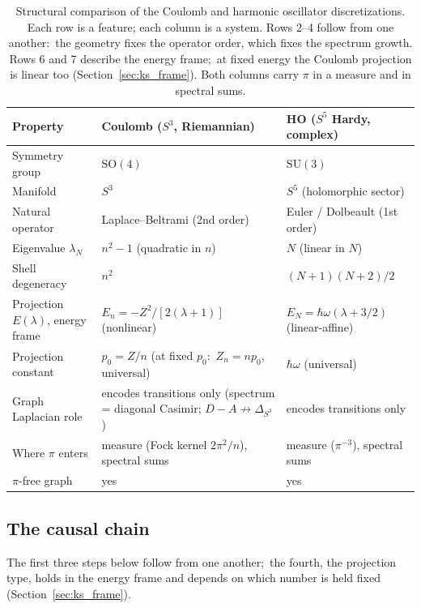 \documentclass[twocolumn,pra,amsmath,amssymb,superscriptaddress]{revtex4-2}
\begin{document}
\begin{table}[t]
\centering
\caption{Structural comparison of the Coulomb and harmonic oscillator
discretizations.  Each row is a feature; each column is a system.
Rows 2--4 follow from one another:\ the geometry fixes the operator
order, which fixes the spectrum growth.  Rows 6 and 7 describe the
energy frame;\ at fixed energy the Coulomb projection is linear too
(Section~\ref{sec:ks_frame}).  Both columns carry $\pi$ in a measure
and in spectral sums.}
\label{tab:asymmetry}
\begin{ruledtabular}
\begin{tabular}{lll}
Property & Coulomb ($S^3$, Riemannian) & HO ($S^5$ Hardy, complex) \\
\hline
Symmetry group & $\mathrm{SO}(4)$ & $\mathrm{SU}(3)$ \\
Manifold & $S^3$ & $S^5$ (holomorphic sector) \\
Natural operator & Laplace--Beltrami (2nd order) & Euler / Dolbeault (1st order) \\
Eigenvalue $\lambda_N$ & $n^2 - 1$ (quadratic in $n$) & $N$ (linear in $N$) \\
Shell degeneracy & $n^2$ & $(N+1)(N+2)/2$ \\
Projection $E(\lambda)$, energy frame & $E_n = -Z^2 / [2(\lambda + 1)]$ (nonlinear) & $E_N = \hbar\omega(\lambda + 3/2)$ (linear-affine) \\
Projection constant & $p_0 = Z / n$ (at fixed $p_0$:\ $Z_n = n p_0$, universal) & $\hbar\omega$ (universal) \\
Graph Laplacian role & encodes transitions only (spectrum = diagonal Casimir; $D - A \not\to \Delta_{S^3}$) & encodes transitions only \\
Where $\pi$ enters & measure (Fock kernel $2\pi^2/n$), spectral sums & measure ($\pi^{-3}$), spectral sums \\
$\pi$-free graph & yes & yes \\

\end{tabular}
\end{ruledtabular}
\end{table}

\subsection{The causal chain}
\label{sec:causal}

The first three steps below follow from one another;\ the fourth,
the projection type, holds in the energy frame and depends on which
number is held fixed (Section~\ref{sec:ks_frame}).
\end{document}
